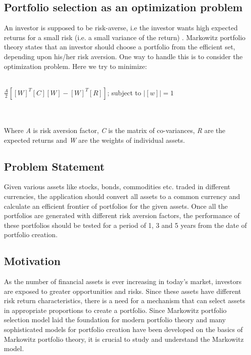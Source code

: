 \subsection{Portfolio selection as an optimization problem}
An investor is supposed to be risk-averse, i.e the investor wants high expected returns for a small risk (i.e. a small variance of the return) \cite {wes:gra}. Markowitz portfolio theory states that an investor should choose a portfolio from the efficient set, depending upon his/her risk aversion. One way to handle this is to consider the optimization problem. Here we try to minimize:\\\\
\centerline{$\frac{A}{2}[\left[W\right]^T\left[C\right]\left[W\right]-\left[W\right]^T\left[R\right]]$; subject to $\left|\left[w\right]\right| =1$}\\\\
Where \textit{A} is risk aversion factor, \textit{C} is the matrix of co-variances, \textit{R} are the expected returns and \textit{W} are the weights of individual assets.

\subsection{Problem Statement}
Given various assets like stocks, bonds, commodities etc. traded in different currencies, the application should convert all assets to a common currency and calculate an efficient frontier of portfolios for the given assets. Once all the portfolios are generated with different risk aversion factors, the performance of these portfolios should be tested for a period of 1, 3 and 5 years from the date of portfolio creation.\\

\subsection{Motivation}
As the number of financial assets is ever increasing in today's market, investors are exposed to greater opportunities and risks. Since these assets have different risk return characteristics, there is a need for a mechanism that can select assets in appropriate proportions to create a portfolio. Since Markowitz portfolio selection model laid the foundation for modern portfolio theory and many sophisticated models for portfolio creation have been developed on the basics of Markowitz portfolio theory, it is crucial to study and understand the Markowitz model.\\

